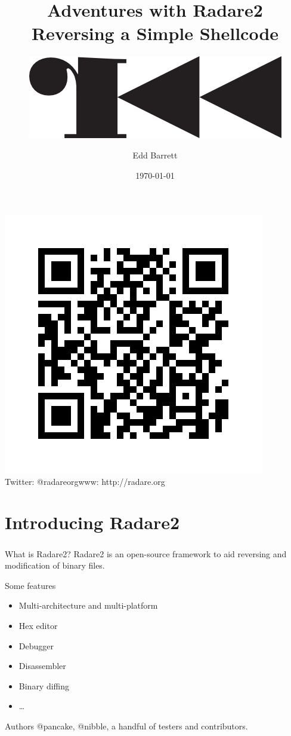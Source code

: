 \documentclass{beamer}
\title{Adventures with Radare2\\Reversing a Simple Shellcode}
\subtitle{\includegraphics[width=.25\textwidth]{r2.png}}
\author{Edd Barrett}
\date{\today}
\begin{document}
\begin{frame}
  \titlepage
  \vspace{-5em}
  \begin{center}
  \includegraphics[width=.25\textwidth]{qr.png}\\
  Twitter: @radareorg\hfill www: http://radare.org
  \end{center}
\end{frame}

\section{Introducing Radare2}

\begin{frame}[fragile]
\frametitle{\insertsection}

\begin{block}{What is Radare2?}
Radare2 is an open-source framework to aid reversing and modification of binary files.
\end{block}

\vfill

\begin{block}{Some features}
\begin{itemize}
\item Multi-architecture and multi-platform
\item Hex editor
\item Debugger
\item Disassembler
\item Binary diffing
\item \ldots
\end{itemize}
\end{block}

\begin{block}{Authors}
@pancake, @nibble, a handful of testers and contributors.
\end{block}

\end{frame}
\end{document}
